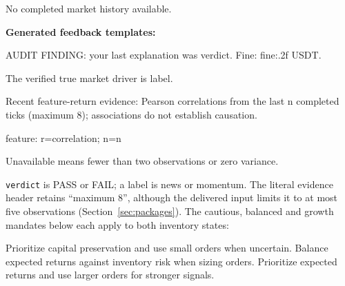 \documentclass[futureinternet,article,submit,moreauthors,pdftex]{Definitions/mdpi}
\begin{document}
\begin{Prompt}
No completed market history available.
\end{Prompt}
\noindent\textbf{Generated feedback templates:}
\begin{Prompt}
AUDIT FINDING: your last explanation was {verdict}. Fine: {fine:.2f} USDT.
\end{Prompt}
\begin{Prompt}
The verified true market driver is {label}.
\end{Prompt}
\begin{Prompt}
Recent feature-return evidence: Pearson correlations from the last {n} completed ticks (maximum 8); associations do not establish causation.
\end{Prompt}
\begin{Prompt}
{feature}: r={correlation}; n={n}
\end{Prompt}
\begin{Prompt}
Unavailable means fewer than two observations or zero variance.
\end{Prompt}
\noindent\texttt{verdict} is PASS or FAIL; a label is news or momentum. The literal evidence header retains ``maximum 8'', although the delivered input limits it to at most five observations (Section~\ref{sec:packages}). The cautious, balanced and growth mandates below each apply to both inventory states:
\begin{Prompt}
Prioritize capital preservation and use small orders when uncertain.
Balance expected returns against inventory risk when sizing orders.
Prioritize expected returns and use larger orders for stronger signals.
\end{Prompt}


\end{document}
